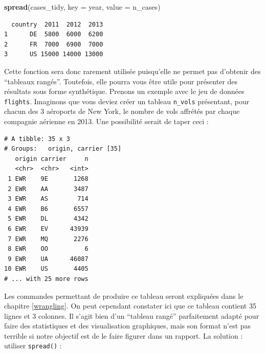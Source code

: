 \documentclass[a4paperpaper,]{article}
\newenvironment{Shaded}{\begin{snugshade}}{\end{snugshade}}
\newcommand{\KeywordTok}[1]{\textcolor[rgb]{0.13,0.29,0.53}{\textbf{#1}}}
\newcommand{\DataTypeTok}[1]{\textcolor[rgb]{0.13,0.29,0.53}{#1}}
\newcommand{\StringTok}[1]{\textcolor[rgb]{0.31,0.60,0.02}{#1}}
\newcommand{\OperatorTok}[1]{\textcolor[rgb]{0.81,0.36,0.00}{\textbf{#1}}}
\newcommand{\NormalTok}[1]{#1}
\theoremstyle{definition}
\theoremstyle{definition}
\theoremstyle{definition}
\theoremstyle{remark}
\begin{document}
\begin{Shaded}
\begin{Highlighting}[]
\KeywordTok{spread}\NormalTok{(cases_tidy, }\DataTypeTok{key =}\NormalTok{ year, }\DataTypeTok{value =}\NormalTok{ n_cases)}
\end{Highlighting}
\end{Shaded}

\begin{verbatim}
  country  2011  2012  2013
1      DE  5800  6000  6200
2      FR  7000  6900  7000
3      US 15000 14000 13000
\end{verbatim}

Cette fonction sera donc rarement utilisée puisqu'elle ne permet pas
d'obtenir des ``tableaux rangés''. Toutefois, elle pourra vous être
utile pour présenter des résultats sous forme synthétique. Prenons un
exemple avec le jeu de données \texttt{flights}. Imaginons que vous
deviez créer un tableau \texttt{n\_vols} présentant, pour chacun des 3
aéroports de New York, le nombre de vols affrétés par chaque compagnie
aérienne en 2013. Une possibilité serait de taper ceci :

\begin{Shaded}
\end{Shaded}

\begin{verbatim}
# A tibble: 35 x 3
# Groups:   origin, carrier [35]
   origin carrier     n
   <chr>  <chr>   <int>
 1 EWR    9E       1268
 2 EWR    AA       3487
 3 EWR    AS        714
 4 EWR    B6       6557
 5 EWR    DL       4342
 6 EWR    EV      43939
 7 EWR    MQ       2276
 8 EWR    OO          6
 9 EWR    UA      46087
10 EWR    US       4405
# ... with 25 more rows
\end{verbatim}

Les commandes permettant de produire ce tableau seront expliquées dans
le chapitre \ref{wrangling}. On peut cependant constater ici que ce
tableau contient 35 lignes et 3 colonnes. Il s'agit bien d'un ``tableau
rangé'' parfaitement adapté pour faire des statistiques et des
visualisation graphiques, mais son format n'est pas terrible si notre
objectif est de le faire figurer dans un rapport. La solution : utiliser
\texttt{spread()} :
\end{document}
